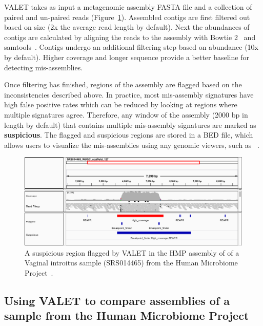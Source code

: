 \documentclass{bioinfo}
\begin{document}
VALET takes as input a metagenomic assembly \textsc{FASTA} file and a collection of paired and un-paired reads (Figure~\ref{fig:valet_pipeline}).
Assembled contigs are first filtered out based on size (2x the average read length by default).
Next the abundances of contigs are calculated by aligning the reads to the assembly with Bowtie 2~\citep{langmead2012fast} and samtools~\citep{li2009sequence}.
Contigs undergo an additional filtering step based on abundance (10x by default).
Higher coverage and longer sequence provide a better baseline for detecting mis-assemblies.

Once filtering has finished, regions of the assembly are flagged based on the inconsistencies described above.
In practice, most mis-assembly signatures have high false positive rates which can be reduced by looking at regions where multiple signatures agree.
Therefore, any window of the assembly (2000 bp in length by default) that contains multiple mis-assembly signatures are marked as \textbf{suspicious}.
The flagged and suspicious regions are stored in a \textsc{BED} file, which allows users to visualize the mis-assemblies using any genomic viewers, such as ~\citep{thorvaldsdottir2012integrative}.

\begin{figure}[tb!]
\begin{center}
\includegraphics[width=.75\textwidth]{figures/hmp_plasmid}
\end{center}
\caption[hmp_sample]{A suspicious region flagged by VALET in the HMP assembly of of a Vaginal introitus sample (SRS014465) from the Human Microbiome Project~\citep{human2012structure}.}
\label{fig:valet_pipeline}
\end{figure}


\subsection{Using VALET to compare assemblies of a sample from the Human Microbiome Project}
\end{document}
